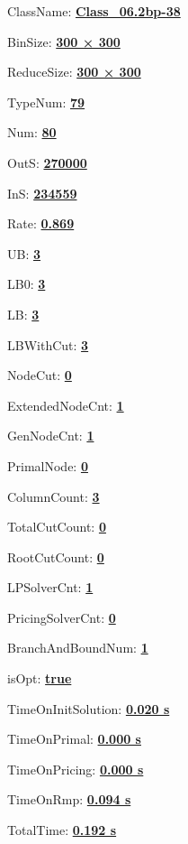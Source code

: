 \documentclass[11pt]{article}
\begin{document}
\pagestyle{empty}


ClassName: \underline{\textbf{Class_06.2bp-38}}
\par
BinSize: \underline{\textbf{300 × 300}}
\par
ReduceSize: \underline{\textbf{300 × 300}}
\par
TypeNum: \underline{\textbf{79}}
\par
Num: \underline{\textbf{80}}
\par
OutS: \underline{\textbf{270000}}
\par
InS: \underline{\textbf{234559}}
\par
Rate: \underline{\textbf{0.869}}
\par
UB: \underline{\textbf{3}}
\par
LB0: \underline{\textbf{3}}
\par
LB: \underline{\textbf{3}}
\par
LBWithCut: \underline{\textbf{3}}
\par
NodeCut: \underline{\textbf{0}}
\par
ExtendedNodeCnt: \underline{\textbf{1}}
\par
GenNodeCnt: \underline{\textbf{1}}
\par
PrimalNode: \underline{\textbf{0}}
\par
ColumnCount: \underline{\textbf{3}}
\par
TotalCutCount: \underline{\textbf{0}}
\par
RootCutCount: \underline{\textbf{0}}
\par
LPSolverCnt: \underline{\textbf{1}}
\par
PricingSolverCnt: \underline{\textbf{0}}
\par
BranchAndBoundNum: \underline{\textbf{1}}
\par
isOpt: \underline{\textbf{true}}
\par
TimeOnInitSolution: \underline{\textbf{0.020 s}}
\par
TimeOnPrimal: \underline{\textbf{0.000 s}}
\par
TimeOnPricing: \underline{\textbf{0.000 s}}
\par
TimeOnRmp: \underline{\textbf{0.094 s}}
\par
TotalTime: \underline{\textbf{0.192 s}}
\par
\newpage
\end{document}
